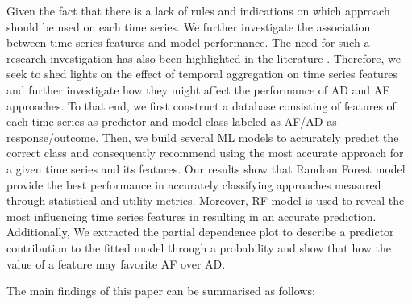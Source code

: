 \documentclass[]{elsarticle} %
\begin{document}
Given the fact that there is a lack of rules and indications on which
approach should be used on each time series. We further investigate the
association between time series features and model performance. The need
for such a research investigation has also been highlighted in the
literature \citep{babai2021demand}. Therefore, we seek to shed lights on
the effect of temporal aggregation on time series features and further
investigate how they might affect the performance of AD and AF
approaches. To that end, we first construct a database consisting of
features of each time series as predictor and model class labeled as
AF/AD as response/outcome. Then, we build several ML models to
accurately predict the correct class and consequently recommend using
the most accurate approach for a given time series and its features. Our
results show that Random Forest model provide the best performance in
accurately classifying approaches measured through statistical and
utility metrics. Moreover, RF model is used to reveal the most
influencing time series features in resulting in an accurate prediction.
Additionally, We extracted the partial dependence plot to describe a
predictor contribution to the fitted model through a probability and
show that how the value of a feature may favorite AF over AD.

The main findings of this paper can be summarised as follows:
\end{document}
